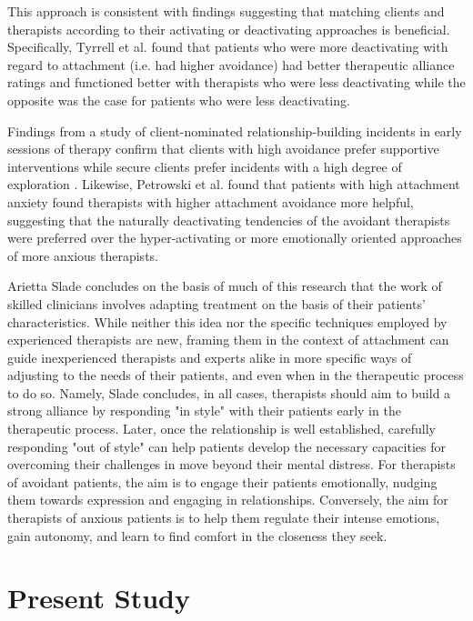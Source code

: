 \documentclass[12pt]{report}
\begin{document}
This approach is consistent with findings suggesting that matching clients and therapists according to their activating or deactivating approaches is beneficial.
Specifically, Tyrrell et al. \citeyear{Tyrrell1999} found that patients who were more deactivating with regard to attachment (i.e. had higher avoidance) had better therapeutic alliance ratings and functioned better with therapists who were less deactivating while the opposite was the case for patients who were less deactivating.

Findings from a study of client-nominated relationship-building incidents in early sessions of therapy confirm that clients with high avoidance prefer supportive interventions while secure clients prefer incidents with a high degree of exploration \cite{Janzen2010}.
Likewise, Petrowski et al. \citeyear{Petrowski2011} found that patients with high attachment anxiety found therapists with higher attachment avoidance more helpful, suggesting that the naturally deactivating tendencies of the avoidant therapists were preferred over the hyper-activating or more emotionally oriented approaches of more anxious therapists.

Arietta Slade \citeyear{Slade2016} concludes on the basis of much of this research that the work of skilled clinicians involves adapting treatment on the basis of their patients' characteristics. While neither this idea nor the specific techniques employed by experienced therapists are new, framing them in the context of attachment can guide inexperienced therapists and experts alike in more specific ways of adjusting to the needs of their patients, and even when in the therapeutic process to do so.
Namely, Slade concludes, in all cases, therapists should aim to build a strong alliance by responding "in style" with their patients early in the therapeutic process.
Later, once the relationship is well established, carefully responding "out of style" can help patients develop the necessary capacities for overcoming their challenges in move beyond their mental distress.
For therapists of avoidant patients, the aim is to engage their patients emotionally, nudging them towards expression and engaging in relationships.
Conversely, the aim for therapists of anxious patients is to help them regulate their intense emotions, gain autonomy, and learn to find comfort in the closeness they seek.

\chapter{Present Study}
\end{document}
